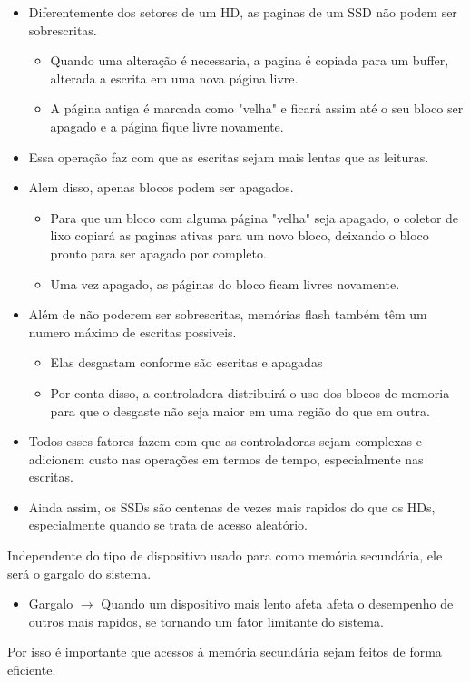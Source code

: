 \documentclass[12pt]{article}
\begin{document}
\begin{itemize}
\begin{itemize}
        \end{itemize}
        \item Diferentemente dos setores de um HD, as paginas de um SSD não 
        podem ser sobrescritas.
        \begin{itemize}
            \item Quando uma alteração é necessaria, a pagina é copiada para um 
            buffer, alterada a escrita em uma nova página livre.
            \item A página antiga é marcada como "velha" e ficará assim até o 
            seu bloco ser apagado e a página fique livre novamente.
        \end{itemize}
        \item Essa operação faz com que as escritas sejam mais lentas que as 
        leituras.
        \item Alem disso, apenas blocos podem ser apagados.
        \begin{itemize}
            \item Para que um bloco com alguma página "velha" seja apagado, o 
            coletor de lixo copiará as paginas ativas para um novo bloco, 
            deixando o bloco pronto para ser apagado por completo.
            \item Uma vez apagado, as páginas do bloco ficam livres novamente.
        \end{itemize} 
        \item Além de não poderem ser sobrescritas, memórias flash também têm 
        um numero máximo de escritas possiveis.
        \begin{itemize}
            \item Elas desgastam conforme são escritas e apagadas
            \item Por conta disso, a controladora distribuirá o uso dos blocos 
            de memoria para que o desgaste não seja maior em uma região do que 
            em outra.
        \end{itemize}
        \item Todos esses fatores fazem com que as controladoras sejam complexas 
        e adicionem custo nas operações em termos de tempo, especialmente nas 
        escritas.
        \item Ainda assim, os SSDs são centenas de vezes mais rapidos do que os 
        HDs, especialmente quando se trata de acesso aleatório.
    \end{itemize}
\vspace{24pt}
Independente do tipo de dispositivo usado para como memória secundária, ele será
o gargalo do sistema.
\begin{itemize}
    \item Gargalo $\rightarrow$ Quando um dispositivo mais lento afeta afeta o 
    desempenho de outros mais rapidos, se tornando um fator limitante do sistema.
\end{itemize}
Por isso é importante que acessos à memória secundária sejam feitos de forma 
eficiente.
\end{document}
